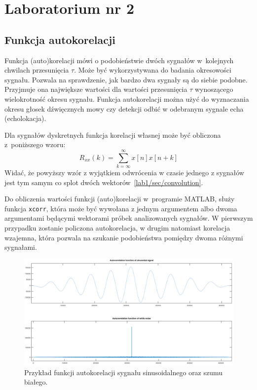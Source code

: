 \section{Laboratorium nr 2}

\subsection{Funkcja autokorelacji}
Funkcja (auto)korelacji mówi o podobieństwie dwóch sygnałów w~kolejnych chwilach przesunięcia $\tau$. Może być wykorzystywana do badania okresowości sygnału. Pozwala  na sprawdzenie, jak bardzo dwa sygnały są do siebie podobne. Przyjmuje ona największe wartości dla wartości przesunięcia $\tau$ wynoszącego wielokrotność okresu sygnału. Funkcja autokorelacji można użyć do wyznaczania okresu głosek dźwięcznych mowy czy detekcji odbić w odebranym sygnale echa (echolokacja).

Dla sygnałów dyskretnych funkcja korelacji własnej może być obliczona z~poniższego wzoru:
\begin{equation}
	R_{xx}(k) = \sum_{k=\infty}^{\infty} x[n]x[n+k]
\end{equation}
Widać, że powyższy wzór z wyjątkiem odwrócenia w czasie jednego z sygnałów jest tym samym co splot dwóch wektorów~\ref{lab1/sec/convolution}. 

Do obliczenia wartości funkcji (auto)korelacji w~programie MATLAB, służy funkcja \texttt{xcorr}, która może być wywołana z jednym argumentem albo dwoma argumentami będącymi wektorami próbek analizowanych sygnałów. W pierwszym przypadku zostanie policzona autokorelacja, w drugim natomiast korelacja wzajemna, która pozwala na szukanie podobieństwa pomiędzy dwoma różnymi sygnałami. 

\begin{figure}[hbt!]
	\centering
	\includegraphics[width=0.9\linewidth]{images/xcorrFunction.png}
	\caption{Przykład funkcji autokorelacji sygnału sinusoidalnego oraz szumu białego.}
	\label{lab2/fig/xcorrFunction}
\end{figure}

